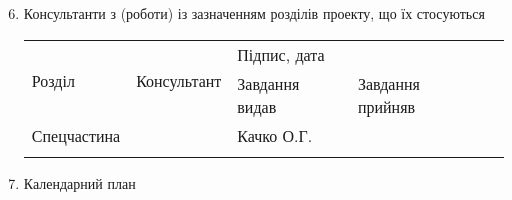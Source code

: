 \newpage
\thispagestyle{empty}

\begin{enumerate}
	[
	labelindent=*,
	style=multiline,
	leftmargin=*,
	label=\arabic*.
	]
	\setcounter{enumi}{5}
	
	\item Консультанти з (роботи) із зазначенням розділів проекту, що їх стосуються
	
	\begin{table}[!h]
	\begin{tabularx}{\textwidth}{XXXXl}
		\cline{1-4}
		\multicolumn{1}{|l|}{\multirow{2}{*}{Розділ}} & \multicolumn{1}{l|}{\multirow{2}{*}{Консультант}} & \multicolumn{2}{l|}{Підпис, дата}                                           &  \\ \cline{3-4}
		\multicolumn{1}{|l|}{}                        & \multicolumn{1}{l|}{}                             & \multicolumn{1}{l|}{Завдання видав} & \multicolumn{1}{l|}{Завдання прийняв} &  \\ \cline{1-4}
		\multicolumn{1}{|l|}{Спецчастина}             & \multicolumn{1}{l|}{}                             & \multicolumn{1}{l|}{Качко О.Г.}     & \multicolumn{1}{l|}{}                 &  \\ \cline{1-4}
		&                                                   &                                     &                                       & 
	\end{tabularx}
	\end{table}
	
	\item Календарний план
	

\end{enumerate}
